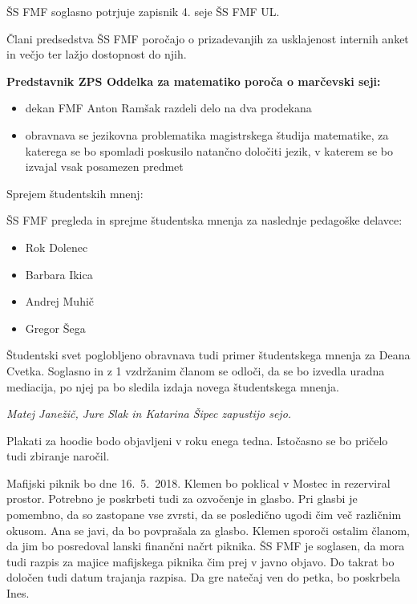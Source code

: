 \documentclass{seja}
\begin{document}
\begin{ad}
	
	\item
	ŠS FMF soglasno potrjuje zapisnik 4. seje ŠS FMF UL.
		
	\item
	Člani predsedstva ŠS FMF poročajo o prizadevanjih za usklajenost internih anket in večjo ter lažjo dostopnost do njih.
	
	\item 
	\textbf{Predstavnik ZPS Oddelka za matematiko poroča o marčevski seji:}
	\begin{itemize}
		\item 
		dekan FMF Anton Ramšak razdeli delo na dva prodekana
		\item 
		obravnava se jezikovna problematika magistrskega študija matematike, za katerega se bo spomladi poskusilo natančno določiti jezik, v katerem se bo izvajal vsak posamezen predmet
	\end{itemize}
		
		
	\item 
		Sprejem študentskih mnenj:
	\begin{sklep}
		ŠS FMF pregleda in sprejme študentska mnenja za naslednje pedagoške delavce:
		\begin{itemize}
			\item Rok Dolenec
			\item Barbara Ikica
			\item Andrej Muhič
			\item Gregor Šega
			\end{itemize}	
	\end{sklep}
		Študentski svet poglobljeno obravnava tudi primer študentskega mnenja za Deana Cvetka. Soglasno in z 1 vzdržanim članom se odloči, da se bo izvedla uradna mediacija, po njej pa bo sledila izdaja novega študentskega mnenja.

\textit{Matej Janežič, Jure Slak in Katarina Šipec zapustijo sejo.}
	
	\item Plakati za hoodie bodo objavljeni v roku enega tedna. Istočasno se bo pričelo tudi zbiranje naročil.
	
	\item 
	Mafijski piknik bo dne 16.~5.~2018. Klemen bo poklical v Mostec in rezerviral prostor. Potrebno je poskrbeti tudi za ozvočenje in glasbo. Pri glasbi je pomembno, da so zastopane vse zvrsti, da se posledično ugodi čim več različnim okusom. Ana se javi, da bo povprašala za glasbo. Klemen sporoči ostalim članom, da jim bo posredoval lanski finančni načrt piknika. ŠS FMF je soglasen, da mora tudi razpis za majice mafijskega piknika čim prej v javno objavo. Do takrat bo določen tudi datum trajanja razpisa. Da gre natečaj ven do petka, bo poskrbela Ines.
	

\end{ad}
\end{document}
